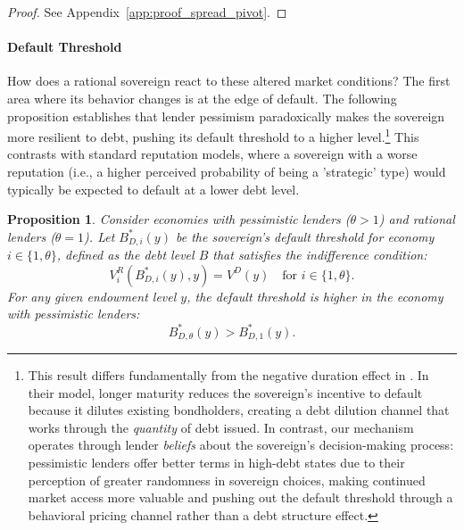 \documentclass[12pt]{article}
\theoremstyle{plain}
\newtheorem{proposition}{Proposition}
\begin{document}
\begin{proof}
	See Appendix~\ref{app:proof_spread_pivot}.
\end{proof}

\paragraph{Default Threshold}
How does a rational sovereign react to these altered market conditions? The
first area where its behavior changes is at the edge of default. The following
proposition establishes that lender pessimism paradoxically makes the sovereign
more resilient to debt, pushing its default threshold to a higher
level.\footnote{This result differs fundamentally from the negative duration
	effect in \citep{ChatterjeeEyigungor2012}. In their model, longer maturity
	reduces the sovereign's incentive to default because it dilutes existing
	bondholders, creating a debt dilution channel that works through the
	\emph{quantity} of debt issued. In contrast, our mechanism operates through
	lender \emph{beliefs} about the sovereign's decision-making process:
	pessimistic lenders offer better terms in high-debt states due to their
	perception of greater randomness in sovereign choices, making continued market
	access more valuable and pushing out the default threshold through a behavioral
	pricing channel rather than a debt structure effect.} This contrasts with
standard reputation models, where a sovereign with a worse reputation (i.e., a
higher perceived probability of being a 'strategic' type) would typically be
expected to default at a lower debt level.

\begin{proposition}
	\label{prop:threshold}
	Consider economies with pessimistic lenders ($\theta > 1$) and rational lenders ($\theta = 1$). Let $B^*_{D,i}(y)$ be the sovereign's default threshold for economy $i \in \{1, \theta\}$, defined as the debt level $B$ that satisfies the indifference condition:
	\begin{equation}
		V^R_i(B^*_{D,i}(y),y) = V^D(y) \quad \text{for } i \in \{1, \theta\}.
		\label{eq:default_threshold_definition}
	\end{equation}
	For any given endowment level $y$, the default threshold is higher in the economy with pessimistic lenders:
	\begin{equation*}
		B^*_{D,\theta}(y) > B^*_{D,1}(y).
	\end{equation*}
\end{proposition}
\end{document}
